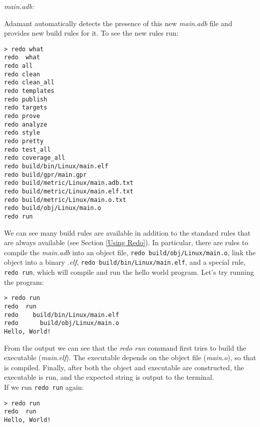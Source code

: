 \textit{main.adb:}

Adamant automatically detects the presence of this new \textit{main.adb} file and provides new build rules for it. To see the new rules run:

\vspace{5mm} %
\begin{verbatim}
> redo what
redo  what
redo all
redo clean
redo clean_all
redo templates
redo publish
redo targets
redo prove
redo analyze
redo style
redo pretty
redo test_all
redo coverage_all
redo build/bin/Linux/main.elf
redo build/gpr/main.gpr
redo build/metric/Linux/main.adb.txt
redo build/metric/Linux/main.elf.txt
redo build/metric/Linux/main.o.txt
redo build/obj/Linux/main.o
redo run
\end{verbatim}
\vspace{5mm} %

We can see many build rules are available in addition to the standard rules that are always available (see Section \ref{Using Redo}). In particular, there are rules to compile the \textit{main.adb} into an object file, \texttt{redo build/obj/Linux/main.o}, link the object into a binary \textit{.elf}, \texttt{redo build/bin/Linux/main.elf}, and a special rule, \texttt{redo run}, which will compile and run the hello world program. Let's try running the program:

\vspace{5mm} %
\begin{verbatim}
> redo run
redo  run
redo    build/bin/Linux/main.elf
redo      build/obj/Linux/main.o
Hello, World!
\end{verbatim}
\vspace{5mm} %

From the output we can see that the \textit{redo run} command first tries to build the executable (\textit{main.elf}). The executable depends on the object file (\textit{main.o}), so that is compiled. Finally, after both the object and executable are constructed, the executable is run, and the expected string is output to the terminal. \\

If we run \texttt{redo run} again:

\vspace{5mm} %
\begin{verbatim}
> redo run
redo  run
Hello, World!
\end{verbatim}
\vspace{5mm} %

